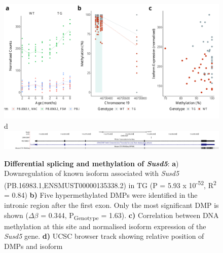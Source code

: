 \begin{figure}[]
	\includegraphics[page=4,scale = 0.4]{Figures/WholeDifferentialAnalysis_DMPDMR.pdf}
	\\
	\hspace*{0.2cm}\vspace{0.5cm}\large d
	\\
	\includegraphics[page=1,trim={1.5cm 0 0 0},scale = 0.9]{Figures/SUSD5_DMP.pdf}
	\captionsetup{width=0.95\textwidth}
	\caption[Differential splicing and methylation of \textit{Susd5}]%
	{\textbf{Differential splicing and methylation of \textit{Susd5}}: \textbf{a}) Downregulation of known isoform associated with \textit{Susd5} (PB.16983.1,ENSMUST00000135338.2) in TG (P = 5.93 x 10\textsuperscript{-52}, R\textsuperscript{2} = 0.84) \textbf{b)} Five hypermethylated DMPs were identified in the intronic region after the first exon. Only the most significant DMP is shown ($\Delta$$\beta$ = 0.344, P\textsubscript{Genotype} = 1.63). \textbf{c)} Correlation between DNA methylation at this site and normalised isoform expression of the \textit{Susd5} gene. \textbf{d)} UCSC browser track showing relative position of DMPs and isoform}    
	\label{fig:IntMeth_Susd5}
\end{figure}

